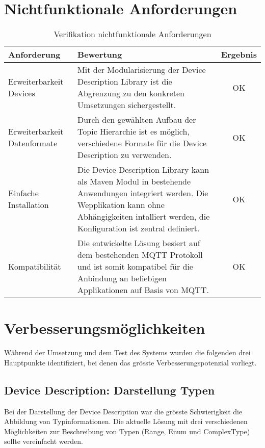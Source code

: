 \section{Nichtfunktionale Anforderungen}

\begin{table}[H]
\begin{tabularx}{\textwidth}{|l|X|c|}

 \hline \rowcolor{lightgray}
 {\bf Anforderung } & {\bf Bewertung } & {\bf Ergebnis} \\  \hline
 
 Erweiterbarkeit Devices & Mit der Modularisierung der Device Description Library ist die Abgrenzung zu den konkreten Umsetzungen sichergestellt. & OK \\ \hline

 Erweiterbarkeit Datenformate   & Durch den gewählten Aufbau der Topic Hierarchie ist es möglich, verschiedene Formate für die Device Description zu verwenden. & OK \\ \hline

 Einfache Installation    & Die Device Description Library kann als Maven Modul in bestehende Anwendungen integriert werden. Die Wepplikation kann ohne Abhängigkeiten intalliert werden, die Konfiguration ist zentral definiert. & OK \\ \hline

 Kompatibilität     & Die entwickelte Lösung besiert auf dem bestehenden MQTT Protokoll und ist somit kompatibel für die Anbindung an beliebigen Applikationen auf Basis von MQTT. & OK \\ \hline


\end{tabularx}
\caption{Verifikation nichtfunktionale Anforderungen}
\end{table}




\section{Verbesserungsmöglichkeiten}

Während der Umsetzung und dem Test des Systems wurden die folgenden drei Hauptpunkte identifiziert, bei denen das grösste Verbesserungspotenzial vorliegt.

\subsection{Device Description: Darstellung Typen}
Bei der Darstellung der Device Description war die grösste Schwierigkeit die Abbildung von Typinformationen. Die aktuelle Lösung mit drei verschiedenen Möglichkeiten zur Beschreibung von Typen (Range, Enum und ComplexType) sollte vereinfacht werden.


